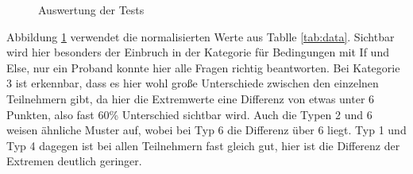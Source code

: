 	
	\begin{figure}[htbp!]
		\centering
		\caption[Auswertung]{Auswertung der Tests}
		\label{img:auswertung}
	\end{figure}
	
	Abbildung \ref{img:auswertung} verwendet die normalisierten Werte aus Tablle \ref{tab:data}. Sichtbar wird hier besonders der Einbruch in der Kategorie für Bedingungen mit If und Else, nur ein Proband konnte hier alle Fragen richtig beantworten. Bei Kategorie 3 ist erkennbar, dass es hier wohl große Unterschiede zwischen den einzelnen Teilnehmern gibt, da hier die Extremwerte eine Differenz von etwas unter 6 Punkten, also fast 60\% Unterschied sichtbar wird. Auch die Typen 2 und 6 weisen ähnliche Muster auf, wobei bei Typ 6 die Differenz über 6 liegt. Typ 1 und Typ 4 dagegen ist bei allen Teilnehmern fast gleich gut, hier ist die Differenz der Extremen deutlich geringer.\\ 
	
	
	
	
	
